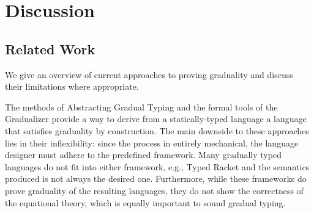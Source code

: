 \section{Discussion}\label{sec:discussion}


\subsection{Related Work}

We give an overview of current approaches to proving graduality and discuss
their limitations where appropriate.


The methods of Abstracting Gradual Typing \cite{garcia-clark-tanter2016} and the
formal tools of the Gradualizer \cite{cimini-siek2016} provide a way to derive
from a statically-typed language a language that satisfies graduality by
construction. The main downside to these approaches lies in their inflexibility:
since the process in entirely mechanical, the language designer must adhere to
the predefined framework.  Many gradually typed languages do not fit into either
framework, e.g., Typed Racket \cite{tobin-hochstadt06, tobin-hochstadt08} and
the semantics produced is not always the desired one.
%
Furthermore, while these frameworks do prove graduality of the resulting
languages, they do not show the correctness of the equational theory, which is
equally important to sound gradual typing.



